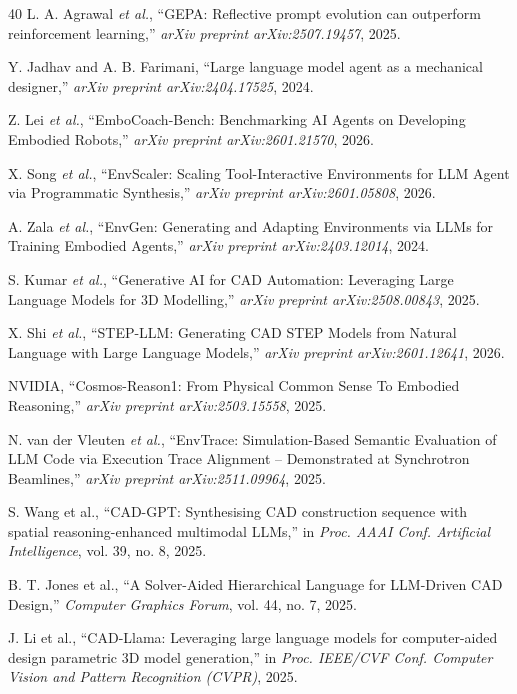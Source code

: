 \documentclass[conference]{IEEEtran}
\begin{document}
\begin{thebibliography}{40}
L. A. Agrawal \emph{et al.}, ``GEPA: Reflective prompt evolution can outperform reinforcement learning,'' \emph{arXiv preprint arXiv:2507.19457}, 2025.

Y. Jadhav and A. B. Farimani, ``Large language model agent as a mechanical designer,'' \emph{arXiv preprint arXiv:2404.17525}, 2024.

Z. Lei \emph{et al.}, ``EmboCoach-Bench: Benchmarking AI Agents on Developing Embodied Robots,'' \emph{arXiv preprint arXiv:2601.21570}, 2026.

X. Song \emph{et al.}, ``EnvScaler: Scaling Tool-Interactive Environments for LLM Agent via Programmatic Synthesis,'' \emph{arXiv preprint arXiv:2601.05808}, 2026.

A. Zala \emph{et al.}, ``EnvGen: Generating and Adapting Environments via LLMs for Training Embodied Agents,'' \emph{arXiv preprint arXiv:2403.12014}, 2024.

S. Kumar \emph{et al.}, ``Generative AI for CAD Automation: Leveraging Large Language Models for 3D Modelling,'' \emph{arXiv preprint arXiv:2508.00843}, 2025.

X. Shi \emph{et al.}, ``STEP-LLM: Generating CAD STEP Models from Natural Language with Large Language Models,'' \emph{arXiv preprint arXiv:2601.12641}, 2026.

NVIDIA, ``Cosmos-Reason1: From Physical Common Sense To Embodied Reasoning,'' \emph{arXiv preprint arXiv:2503.15558}, 2025.

N. van der Vleuten \emph{et al.}, ``EnvTrace: Simulation-Based Semantic Evaluation of LLM Code via Execution Trace Alignment -- Demonstrated at Synchrotron Beamlines,'' \emph{arXiv preprint arXiv:2511.09964}, 2025.

S. Wang et al., ``CAD-GPT: Synthesising CAD construction sequence with spatial reasoning-enhanced multimodal LLMs,'' in \emph{Proc. AAAI Conf. Artificial Intelligence}, vol. 39, no. 8, 2025.

B. T. Jones et al., ``A Solver-Aided Hierarchical Language for LLM-Driven CAD Design,'' \emph{Computer Graphics Forum}, vol. 44, no. 7, 2025.

J. Li et al., ``CAD-Llama: Leveraging large language models for computer-aided design parametric 3D model generation,'' in \emph{Proc. IEEE/CVF Conf. Computer Vision and Pattern Recognition (CVPR)}, 2025.


\end{thebibliography}
\end{document}
